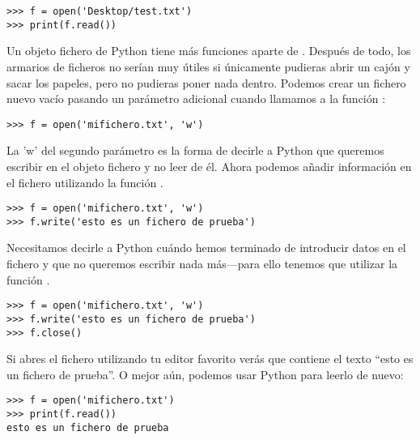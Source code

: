 \begin{LINUX}

\begin{listing}
\begin{verbatim}
>>> f = open('Desktop/test.txt')
>>> print(f.read())
\end{verbatim}
\end{listing}
 
\end{LINUX}

Un objeto fichero de Python tiene más funciones aparte de . Después de todo, los armarios de ficheros no serían muy útiles si únicamente pudieras abrir un cajón y sacar los papeles, pero no pudieras poner nada dentro.  Podemos crear un fichero nuevo vacío pasando un parámetro adicional cuando llamamos a la función :

\begin{listing}
\begin{verbatim}
>>> f = open('mifichero.txt', 'w')
\end{verbatim}
\end{listing}

La 'w' del segundo parámetro es la forma de decirle a Python que queremos escribir en el objeto fichero y no leer de él.  Ahora podemos añadir información en el fichero utilizando la función .

\begin{listing}
\begin{verbatim}
>>> f = open('mifichero.txt', 'w')
>>> f.write('esto es un fichero de prueba')
\end{verbatim}
\end{listing}

Necesitamos decirle a Python cuándo hemos terminado de introducir datos en el fichero y que no queremos escribir nada más---para ello tenemos que utilizar la función .

\begin{listing}
\begin{verbatim}
>>> f = open('mifichero.txt', 'w')
>>> f.write('esto es un fichero de prueba')
>>> f.close()
\end{verbatim}
\end{listing}

Si abres el fichero utilizando tu editor favorito verás que contiene el texto ``esto es un fichero de prueba''.  O mejor aún, podemos usar Python para leerlo de nuevo:

\begin{listing}
\begin{verbatim}
>>> f = open('mifichero.txt')
>>> print(f.read())
esto es un fichero de prueba
\end{verbatim}
\end{listing}

\newpage
